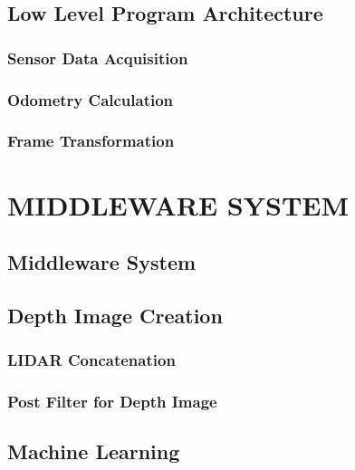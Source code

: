 \section{Low Level Program Architecture}
\LowLevelProgramArchitecture
\subsection{Sensor Data Acquisition}
\SensorDataAcquisition
\subsection{Odometry Calculation}
\OdometryCalculation
\subsection{Frame Transformation}
\FrameTransformation

\chapter{MIDDLEWARE SYSTEM}
\label{sec:chap3_metodologi3}
\section*{ } 

\section{Middleware System}
\MiddlewareSystem

\section{Depth Image Creation}
\DepthImageCreation
\subsection{LIDAR Concatenation}
\LIDARConcatenation
\subsection{Post Filter for Depth Image}
\PostFilterForDepthImage

\section{Machine Learning}
\MachineLearning
